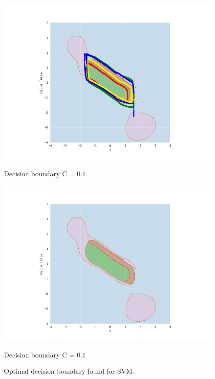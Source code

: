             \begin{figure}[]
                \begin{minipage}[b]{0.5\linewidth}
                    \centering
                    \includegraphics[width = 1.2\textwidth]{figures/analysis/svm/SVM_servo_C01.png}
                    \caption*{Decision boundary C = $0.1$}
                \end{minipage}
                \hfill
                \begin{minipage}[b]{0.5\linewidth}
                    \centering
                    \includegraphics[width = 1.2\textwidth]{figures/analysis/svm/SVM_servo_C01countour.png}
                    \caption*{Decision boundary C = $0.1$}
                \end{minipage}
                \caption{Optimal decision boundary found for SVM.}
                \label{fig:svm_optimal_servo}
            \end{figure}
        
